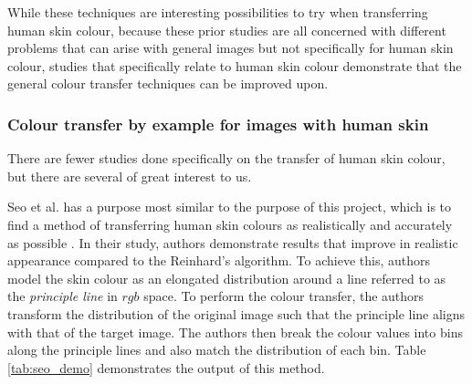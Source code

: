 While these techniques are interesting possibilities to try when transferring human skin colour, because these prior studies are all concerned with different problems that can arise with general images but not specifically for human skin colour, studies that specifically relate to human skin colour demonstrate that the general colour transfer techniques can be improved upon.

\subsubsection{Colour transfer by example for images with human skin}
There are fewer studies done specifically on the transfer of human skin colour, but there are several of great interest to us.

Seo et al. has a purpose most similar to the purpose of this project, which is to find a method of transferring human skin colours as realistically and accurately as possible \cite{seo_2005_transfer}. In their study, authors demonstrate results that improve in realistic appearance compared to the Reinhard's algorithm. To achieve this, authors model the skin colour as an elongated distribution around a line referred to as the \textit{principle line} in $rgb$ space. To perform the colour transfer, the authors transform the distribution of the original image such that the principle line aligns with that of the target image. The authors then break the colour values into bins along the principle lines and also match the distribution of each bin. Table \ref{tab:seo_demo} demonstrates the output of this method.

